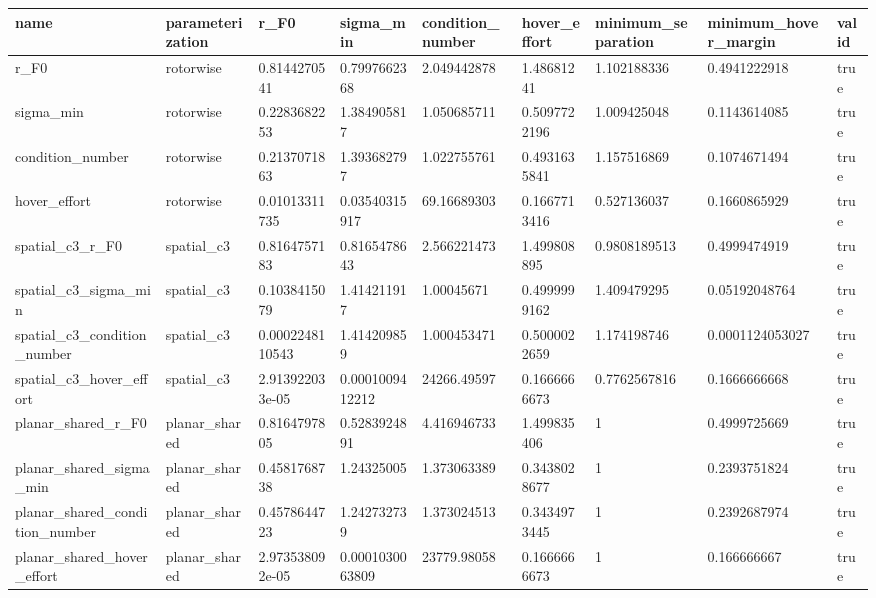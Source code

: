 \begin{tabular}{@{}lllllllll@{}}
\toprule
name & parameterization & r\_F0 & sigma\_min & condition\_number & hover\_effort & minimum\_separation & minimum\_hover\_margin & valid \\
\midrule
r\_F0 & rotorwise & 0.8144270541 & 0.7997662368 & 2.049442878 & 1.48681241 & 1.102188336 & 0.4941222918 & true \\
sigma\_min & rotorwise & 0.2283682253 & 1.384905817 & 1.050685711 & 0.5097722196 & 1.009425048 & 0.1143614085 & true \\
condition\_number & rotorwise & 0.2137071863 & 1.393682797 & 1.022755761 & 0.4931635841 & 1.157516869 & 0.1074671494 & true \\
hover\_effort & rotorwise & 0.01013311735 & 0.03540315917 & 69.16689303 & 0.1667713416 & 0.527136037 & 0.1660865929 & true \\
spatial\_c3\_r\_F0 & spatial\_c3 & 0.8164757183 & 0.8165478643 & 2.566221473 & 1.499808895 & 0.9808189513 & 0.4999474919 & true \\
spatial\_c3\_sigma\_min & spatial\_c3 & 0.1038415079 & 1.414211917 & 1.00045671 & 0.4999999162 & 1.409479295 & 0.05192048764 & true \\
spatial\_c3\_condition\_number & spatial\_c3 & 0.0002248110543 & 1.414209859 & 1.000453471 & 0.5000022659 & 1.174198746 & 0.0001124053027 & true \\
spatial\_c3\_hover\_effort & spatial\_c3 & 2.913922033e-05 & 0.0001009412212 & 24266.49597 & 0.1666666673 & 0.7762567816 & 0.1666666668 & true \\
planar\_shared\_r\_F0 & planar\_shared & 0.8164797805 & 0.5283924891 & 4.416946733 & 1.499835406 & 1 & 0.4999725669 & true \\
planar\_shared\_sigma\_min & planar\_shared & 0.4581768738 & 1.24325005 & 1.373063389 & 0.3438028677 & 1 & 0.2393751824 & true \\
planar\_shared\_condition\_number & planar\_shared & 0.4578644723 & 1.242732739 & 1.373024513 & 0.3434973445 & 1 & 0.2392687974 & true \\
planar\_shared\_hover\_effort & planar\_shared & 2.973538092e-05 & 0.0001030063809 & 23779.98058 & 0.1666666673 & 1 & 0.166666667 & true \\
\bottomrule
\end{tabular}
